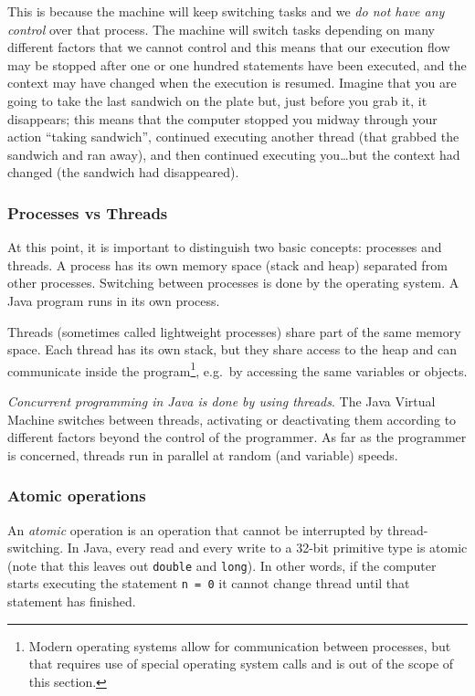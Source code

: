 This is because the machine will keep switching tasks and we \emph{do not
have any control} over that process. The machine will switch tasks
depending on many different factors that we cannot control and this %
means that our execution flow may be stopped after one or one hundred
statements have been executed, and the context may have changed when
the execution is resumed. Imagine that you are going to take the last
sandwich on the plate but, just before you grab it, it disappears;
this means that the computer stopped you midway through your action
``taking sandwich'', continued
executing another thread (that grabbed the sandwich and ran away), and
then continued executing you\ldots but the context had changed (the
sandwich had disappeared). 

\subsubsection{Processes vs Threads}
\label{sec:processes-vs-threads}

At this point, it is important to distinguish two basic concepts:
processes and threads. A process has its own memory space (stack and
heap) separated from other processes. Switching between processes is
done by the operating system. A Java program runs in its own process. 

Threads (sometimes called lightweight processes) share part of the
same memory space. Each thread has its own stack, but they share
access to the heap and can communicate inside the
program\footnote{Modern operating systems allow for communication
  between processes, but that requires use of special operating system
  calls and is out of the scope of this section.}, e.g.~by accessing
the same variables or objects. 

\emph{Concurrent programming in Java is done by using threads}. The Java
Virtual Machine switches between threads, activating or deactivating
them according to different factors beyond the control of the
programmer. As far as the programmer is concerned, threads run in
parallel at random (and variable) speeds. 

\subsubsection{Atomic operations}
\label{sec:atomic-operations}

An \emph{atomic} operation is an operation that cannot be interrupted
by thread-switching. In Java, every read and every write to a 32-bit
primitive type is atomic (note that this leaves out \verb+double+ and
\verb+long+). In other words, if the computer starts executing the
statement \verb+n = 0+ it cannot change thread until that statement
has finished.

